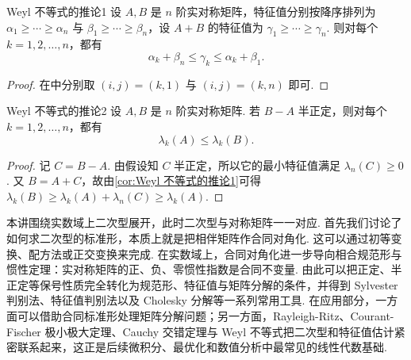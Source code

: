\begin{corollary}{}{Weyl 不等式的推论1}
    设 $A,B$ 是 $n$ 阶实对称矩阵，特征值分别按降序排列为 $\alpha_1\geqslant \cdots \geqslant \alpha_n$ 与 $\beta_1\geqslant \cdots \geqslant \beta_n$，设 $A+B$ 的特征值为 $\gamma_1\geqslant \cdots \geqslant \gamma_n$. 则对每个 $k=1,2,\ldots,n$，都有
    \[
        \alpha_k+\beta_n\leqslant \gamma_k\leqslant \alpha_k+\beta_1.
    \]
\end{corollary}

\begin{proof}
    在中分别取 $(i,j)=(k,1)$ 与 $(i,j)=(k,n)$ 即可.
\end{proof}

\begin{corollary}{}{Weyl 不等式的推论2}
    设 $A,B$ 是 $n$ 阶实对称矩阵. 若 $B-A$ 半正定，则对每个 $k=1,2,\ldots,n$，都有
    \[
        \lambda_k(A)\leqslant \lambda_k(B).
    \]
\end{corollary}

\begin{proof}
    记 $C=B-A$. 由假设知 $C$ 半正定，所以它的最小特征值满足 $\lambda_n(C)\geqslant 0$. 又 $B=A+C$，故由\autoref{cor:Weyl 不等式的推论1}可得 $\lambda_k(B)\geqslant \lambda_k(A)+\lambda_n(C)\geqslant \lambda_k(A)$.
\end{proof}

\begin{summary}
    本讲围绕实数域上二次型展开，此时二次型与对称矩阵一一对应. 首先我们讨论了如何求二次型的标准形，本质上就是把相伴矩阵作合同对角化. 这可以通过初等变换、配方法或正交变换来完成. 在实数域上，合同对角化进一步导向相合规范形与惯性定理：实对称矩阵的正、负、零惯性指数是合同不变量. 由此可以把正定、半正定等保号性质完全转化为规范形、特征值与矩阵分解的条件，并得到 Sylvester 判别法、特征值判别法以及 Cholesky 分解等一系列常用工具. 在应用部分，一方面可以借助合同标准形处理矩阵分解问题；另一方面，Rayleigh-Ritz、Courant-Fischer 极小极大定理、Cauchy 交错定理与 Weyl 不等式把二次型和特征值估计紧密联系起来，这正是后续微积分、最优化和数值分析中最常见的线性代数基础.
\end{summary}

